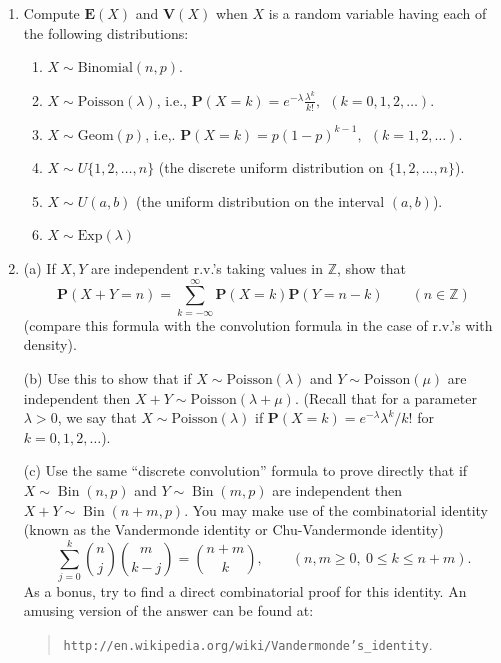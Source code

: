 \documentclass[12pt]{article}
\newcommand{\Z}{\mathbb{Z}}
\newcommand{\prob}{\mathbf{P}}
\newcommand{\expec}{\mathbf{E}}
\newcommand{\var}{\mathbf{V}}
\theoremstyle{example}
\begin{document}
\begin{enumerate}
\medskip\noindent
(b) Define
$$ R_n = \sum_{k=1}^n 1_{A_k} = \#\{ 1\le k\le n: k\textrm{ is a record time} \}, \qquad (n=1,2,\ldots).$$
Compute $\expec(R_n)$ and $\var(R_n)$. Deduce that if $(m_n)_{n=1}^\infty$ is a sequence of positive numbers such that $m_n \uparrow \infty$, however slowly, then the number $R_n$ of record times up to time $n$ satisfies
$$ \prob\left(|R_n - \log n|>m_n \sqrt{\log n}\right) \xrightarrow[n\to\infty]{} 0. $$

\item Compute $\expec(X)$ and $\var(X)$ when $X$ is a random variable having each of the following distributions:
\begin{enumerate}
\item $X \sim \textrm{Binomial}(n,p)$.%
\item $X \sim \textrm{Poisson}(\lambda)$, i.e., $\prob(X=k)=e^{-\lambda} \frac{\lambda^k}{k!}, \ \ (k=0,1,2,\ldots)$.
\item $X \sim \textrm{Geom}(p)$, i.e,. $\prob(X=k)=p(1-p)^{k-1}, \ \ (k=1,2,\ldots)$.
\item $X \sim U\{1,2,\ldots,n\}$ (the discrete uniform distribution on $\{1,2,\ldots,n\}$).
\item $X \sim U(a,b)$ (the uniform distribution on the interval $(a,b)$).
\item $X \sim \textrm{Exp}(\lambda)$
\end{enumerate}

\item
 (a) If $X,Y$ are independent r.v.'s taking values in $\Z$, show that
$$ \prob(X+Y = n) = \sum_{k=-\infty}^\infty \prob(X=k) \prob(Y=n-k) \qquad(n\in\Z)
$$
(compare this formula with the convolution formula in the case of r.v.'s with density).

\medskip \noindent
(b) Use this to show that if $X\sim \textrm{Poisson}(\lambda)$ and $Y\sim \textrm{Poisson}(\mu)$ are independent then
$X+Y \sim \textrm{Poisson}(\lambda+\mu)$. (Recall that for a parameter $\lambda>0$, we say that $X\sim \textrm{Poisson}(\lambda)$ if $\prob(X=k)=e^{-\lambda} \lambda^k/k!$ for $k=0,1,2,\ldots$).

\medskip \noindent
(c) Use the same ``discrete convolution'' formula to prove directly that if $X \sim \operatorname{Bin}(n,p)$ and $Y\sim \operatorname{Bin}(m,p)$ are independent then $X+Y \sim \operatorname{Bin}(n+m,p)$. You may make use of the combinatorial identity (known as the Vandermonde identity or Chu-Vandermonde identity)
$$ \sum_{j=0}^k \binom{n}{j} \binom{m}{k-j} = \binom{n+m}{k}, \qquad (n,m\ge 0,\ 0\le k\le n+m). $$
As a bonus, try to find a direct combinatorial proof for this identity. An amusing version of the answer can be found at: \begin{quote}
\texttt{http://en.wikipedia.org/wiki/Vandermonde's\_identity}.
\end{quote}


\end{enumerate}
\end{document}
